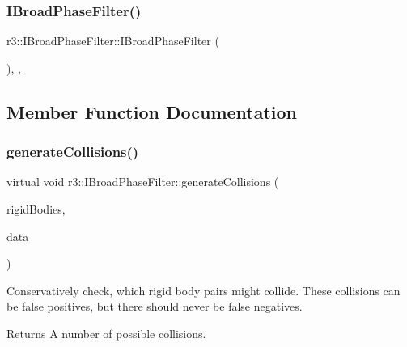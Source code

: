 \mbox{\label{classr3_1_1_i_broad_phase_filter_ab1eb5dc44548078aa0716eedbab8ac11}} 
\subsubsection{\texorpdfstring{I\+Broad\+Phase\+Filter()}{IBroadPhaseFilter()}}
{\footnotesize\ttfamily r3\+::\+I\+Broad\+Phase\+Filter\+::\+I\+Broad\+Phase\+Filter (\begin{DoxyParamCaption}{ }\end{DoxyParamCaption})\hspace{0.3cm}{\ttfamily [explicit]}, {\ttfamily [protected]}, {\ttfamily [default]}}



\subsection{Member Function Documentation}
\mbox{\label{classr3_1_1_i_broad_phase_filter_a19bfa977243bcdd0ec143a0aca750649}} 
\subsubsection{\texorpdfstring{generate\+Collisions()}{generateCollisions()}}
{\footnotesize\ttfamily virtual void r3\+::\+I\+Broad\+Phase\+Filter\+::generate\+Collisions (\begin{DoxyParamCaption}\item[{const std\+::vector$<$ \mbox{\hyperlink{classr3_1_1_rigid_body}{Rigid\+Body}} $\ast$$>$ \&}]{rigid\+Bodies,  }\item[{\mbox{\hyperlink{classr3_1_1_broad_phase_collision_data}{Broad\+Phase\+Collision\+Data}} \&}]{data }\end{DoxyParamCaption})\hspace{0.3cm}{\ttfamily [pure virtual]}}

Conservatively check, which rigid body pairs might collide. These collisions can be false positives, but there should never be false negatives. \begin{DoxyReturn}{Returns}
A number of possible collisions. 
\end{DoxyReturn}


